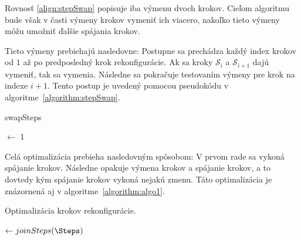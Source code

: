 \documentclass[
  digital, %
  oneside, %
  table,   %
  lof,     %
  nolot,     %
]{fithesis3}
\begin{document}
Rovnosť \ref{align:stepSwap} popisuje iba výmenu dvoch krokov. Cieľom algoritmu bude však v časti výmeny krokov vymeniť ich viacero, nakoľko tieto výmeny môžu umožniť ďalšie spájania krokov. 

Tieto výmeny prebiehajú nasledovne: Postupne sa prechádza každý index krokov od $1$ až po predposledný krok rekonfigurácie. Ak sa kroky $\mathcal{S}_i$ a $\mathcal{S}_{i + 1}$ dajú vymeniť, tak sa vymenia. Následne sa pokračuje testovaním výmeny pre krok na indexe $i + 1$. Tento postup je uvedený pomocou pseudokódu v algoritme~\ref{algorithm:stepSwap}. 

\begin{algorithm}
    \caption{swapSteps}
    \label{algorithm:stepSwap}
    
    \DontPrintSemicolon
    
    \CurrIndex $\leftarrow$ 1\;
\end{algorithm}

Celá optimalizácia prebieha nasledovným spôsobom: V prvom rade sa vykoná spájanie krokov. Následne opakuje výmena krokov a spájanie krokov, a to dovtedy kým spájanie krokov vykoná nejakú zmenu. Táto optimalizácia je znázornená aj v algoritme~\ref{algorithm:algo1}. 

\begin{algorithm}
    \caption{Optimalizácia krokov rekonfigurácie. }
    \label{algorithm:algo1}
    
    \DontPrintSemicolon
    
    \Steps $\leftarrow joinSteps(\Steps)$\;
\end{algorithm}
\end{document}
